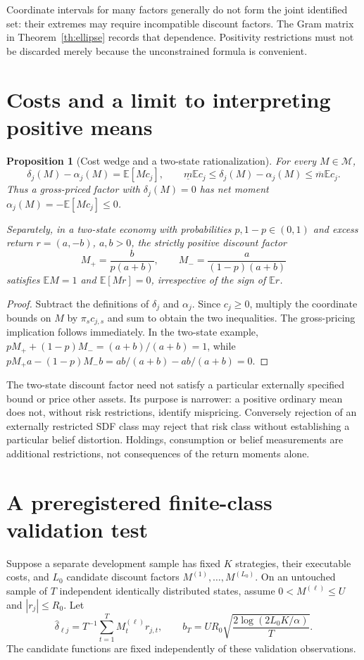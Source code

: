 \documentclass[11pt,a4paper]{article}
\newtheorem{proposition}[theorem]{Proposition}
\theoremstyle{definition}
\theoremstyle{remark}
\newcommand{\E}{\mathbb E}
\begin{document}
Coordinate intervals for many factors generally do not form the joint identified set: their extremes may require incompatible discount factors. The Gram matrix in Theorem~\ref{th:ellipse} records that dependence. Positivity restrictions must not be discarded merely because the unconstrained formula is convenient.

\section{Costs and a limit to interpreting positive means}
\begin{proposition}[Cost wedge and a two-state rationalization]\label{pr:cost}
For every $M\in\mathcal M$,
\[
 \delta_j(M)-\alpha_j(M)=\E[Mc_j],\qquad
 \underline m\E c_j\leq\delta_j(M)-\alpha_j(M)
                         \leq\overline m\E c_j.
\]
Thus a gross-priced factor with $\delta_j(M)=0$ has net moment $\alpha_j(M)=-\E[Mc_j]\leq0$.

Separately, in a two-state economy with probabilities $p,1-p\in(0,1)$ and excess return $r=(a,-b)$, $a,b>0$, the strictly positive discount factor
\[
 M_+=\frac{b}{p(a+b)},\qquad
 M_-=\frac{a}{(1-p)(a+b)}
\]
satisfies $\E M=1$ and $\E[Mr]=0$, irrespective of the sign of $\E r$.
\end{proposition}
\begin{proof}
Subtract the definitions of $\delta_j$ and $\alpha_j$. Since $c_j\geq0$, multiply the coordinate bounds on $M$ by $\pi_sc_{j,s}$ and sum to obtain the two inequalities. The gross-pricing implication follows immediately. In the two-state example,
$pM_++(1-p)M_-=(a+b)/(a+b)=1$, while
$pM_+a-(1-p)M_-b=ab/(a+b)-ab/(a+b)=0$.
\end{proof}

The two-state discount factor need not satisfy a particular externally specified bound or price other assets. Its purpose is narrower: a positive ordinary mean does not, without risk restrictions, identify mispricing. Conversely rejection of an externally restricted SDF class may reject that risk class without establishing a particular belief distortion. Holdings, consumption or belief measurements are additional restrictions, not consequences of the return moments alone.

\section{A preregistered finite-class validation test}
Suppose a separate development sample has fixed $K$ strategies, their executable costs, and $L_0$ candidate discount factors $M^{(1)},\ldots,M^{(L_0)}$. On an untouched sample of $T$ independent identically distributed states, assume $0<M^{(\ell)}\leq U$ and $|r_j|\leq R_0$. Let
\[
 \widehat\delta_{\ell j}=T^{-1}\sum_{t=1}^T M_t^{(\ell)}r_{j,t},\qquad
 b_T=UR_0\sqrt{\frac{2\log(2L_0K/\alpha)}{T}}.
\]
The candidate functions are fixed independently of these validation observations.
\end{document}
